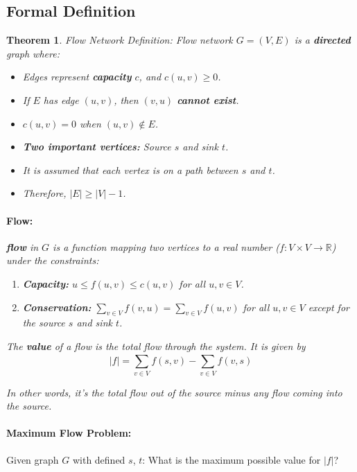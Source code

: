 \documentclass[a4paper,12pt]{report}
\newtheorem{theorem}{Theorem}
\begin{document}
\subsection{Formal Definition}

\begin{theorem}{Flow Network Definition: }
Flow network $G = (V,E)$ is a \textbf{directed} graph where: 
\begin{itemize}
\item Edges represent \textbf{capacity} $c$, and $c(u,v)\geq 0$.
\item If $E$ has edge $(u,v)$, then $(v,u)$ \textbf{cannot exist}.
\item $c(u,v) = 0$ when $(u,v)\notin E$.
\item \textbf{Two important vertices: } Source $s$ and sink $t$. 
\item It is assumed that each vertex is on a path between $s$ and $t$. 
\item Therefore, $|E| \geq |V|-1$.
\end{itemize}

\paragraph{Flow: } \textbf{flow} in $G$ is a function mapping two vertices to a real number ($f:V\times V \to \mathbb{R}$) under the constraints:
\begin{enumerate}
\item \textbf{Capacity: } $u \leq f(u,v) \leq c(u,v)$ for all $u,v\in V$.
\item \textbf{Conservation: } $\sum_{v\in V} f(v,u) = \sum_{v\in V} f(u,v)$ for all $u,v\in V$ except for the source $s$ and sink $t$.
\end{enumerate}


The \textbf{value} of a flow is the total flow through the system. It is given by 
\begin{equation}
|f| = \sum_{v\in V}^{} f(s,v) - \sum_{v\in V}^{} f(v,s)
\end{equation}

In other words, it's the total flow out of the source minus any flow coming into the source. 
\end{theorem}


\paragraph{Maximum Flow Problem: } Given graph $G$ with defined $s$, $t$: What is the maximum possible value for $|f|$?
\end{document}
